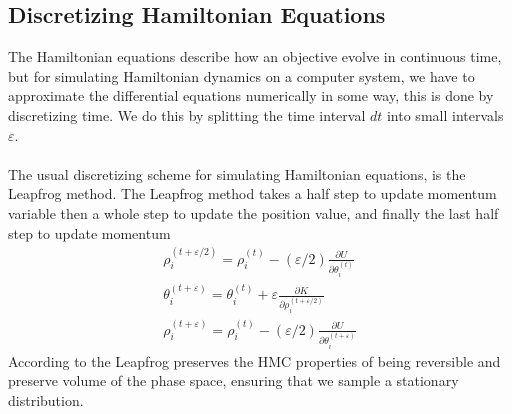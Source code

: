 \subsection{Discretizing Hamiltonian Equations}
The Hamiltonian equations describe how an objective evolve in continuous time, but for simulating Hamiltonian dynamics on a computer system, we have to approximate the differential equations numerically in some way, this is done by discretizing time. We do this by splitting the time interval $dt$ into small intervals $\varepsilon$. 
\\
\\
The usual discretizing scheme for simulating Hamiltonian equations, is the Leapfrog method. The Leapfrog method takes a half step to update momentum variable then a whole step to update the position value, and finally the last half step to update momentum
\begin{equation*}
\begin{split}
\rho_{i}^{(t+\varepsilon / 2)}=\rho_{i}^{(t)}-(\varepsilon / 2) \frac{\partial U}{\partial \theta_{i}^{(t)}} \\
\theta_{i}^{(t+\varepsilon)}=\theta_{i}^{(t)}+\varepsilon \frac{\partial K}{\partial \rho_{i}^{(t+\varepsilon / 2)}} \\
\rho_{i}^{(t+\varepsilon)}=\rho_{i}^{(t)}-(\varepsilon / 2) \frac{\partial U}{\partial \theta_{i}^{(t+\varepsilon)}}
\end{split}
\end{equation*}
According to \cite{neal2012mcmc} the Leapfrog preserves the HMC properties of being reversible and preserve volume of the phase space, ensuring that we sample a stationary distribution.


